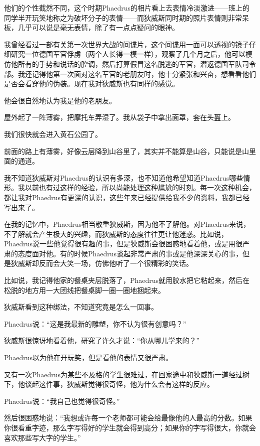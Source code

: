 \documentclass[UTF8]{article}
\begin{document}
\par 他们的个性截然不同，这个时期Phaedrus的相片看上去表情冷淡激进——班上的同学半开玩笑地称之为破坏分子的表情——而狄威斯同时期的照片表情则非常呆板，几乎可以说是毫无表情，除了有一点点疑问的眼神。
\par 我曾经看过一部有关第一次世界大战的间谍片，这个间谍用一面可以透视的镜子仔细研究一位德国军官俘虏（两个人长得一模一样），观察了几个月之后，他可以模仿他所有的手势和说话的腔调，然后打算假冒这名脱逃的军官，潜返德国军队司令部。我还记得他第一次面对这名军官的老朋友时，他十分紧张和兴奋，想看看他们是否会看穿他的伪装。现在我对狄威斯也有同样的感觉。
\par 他会很自然地认为我是他的老朋友。
\par 屋外起了一阵薄雾，把摩托车弄湿了。我从袋子中拿出面罩，套在头盔上。
\par 我们很快就会进入黄石公园了。
\par 前面的路上有薄雾，好像云层降到山谷里了，其实并不能算是山谷，只能说是山里面的通道。
\par 我不知道狄威斯对Phaedrus的认识有多深，也不知道他希望知道Phaedrus哪些情形。我以前也有过这样的经验，所以尚能处理这种尴尬的时刻。每一次这种机会，都让我对Phaedrus有更深的认识，这些年来已经提供给我不少的资料，我都已经写出来了。
\par 在我的记忆中，Phaedrus相当敬重狄威斯，因为他不了解他。对Phaedrus来说，不了解就会产生极大的兴趣，而狄威斯的态度往往更让他迷惑。比如说，Phaedrus说一些他觉得很有趣的事，但是狄威斯会很困惑地看着他，或是用很严肃的态度面对他。有的时候Phaedrus谈起非常严肃的事或是他深深关心的事，但是狄威斯却反而会大笑一场，仿佛他听了一个很精彩的笑话。
\par 比如说，我记得他家的餐桌夹层脱落了，Phaedrus就用胶水把它粘起来，然后在松脱的地方用一大团线把餐桌脚一圈一圈地捆起来。
\par 狄威斯看到这种绑法，不知道究竟是怎么一回事。
\par Phaedrus说：“这是我最新的雕塑，你不认为很有创意吗？”
\par 狄威斯很惊讶地看着他，研究了许久才说：“你从哪儿学来的？”
\par Phaedrus以为他在开玩笑，但是看他的表情又很严肃。
\par 又有一次Phaedrus为某些不及格的学生很难过，在回家途中和狄威斯一道经过树下，他谈起这件事，狄威斯觉得很奇怪，他为什么会有这样的反应。
\par Phaedrus说：“我自己也觉得很奇怪。”
\par 然后很困惑地说：“我想或许每一个老师都可能会给最像他的人最高的分数。如果你很看重字迹，那么字写得好的学生就会得到高分；如果你的字写得很大，你就会喜欢那些写大字的学生。”
\end{document}
